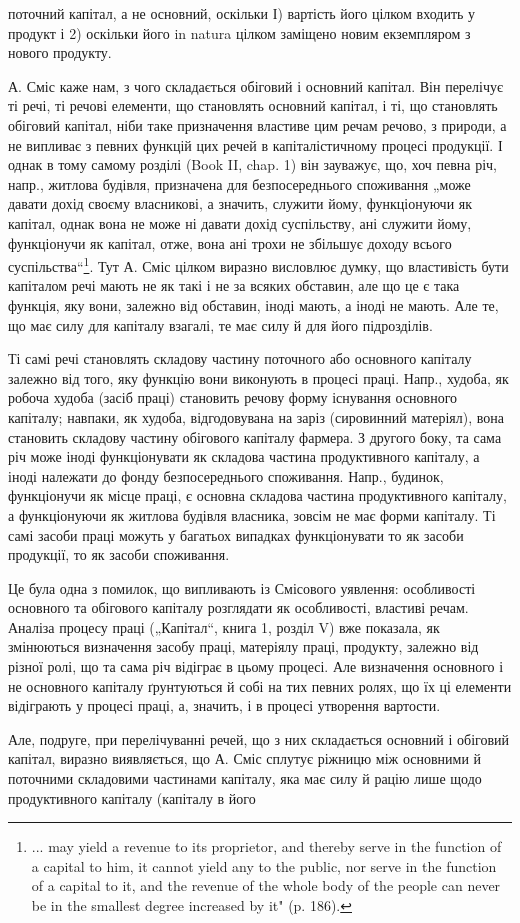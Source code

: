 \parcont{}  %
поточний капітал, а не основний, оскільки І) вартість його цілком входить
у продукт і 2) оскільки його in natura цілком заміщено новим екземпляром
з нового продукту.

А. Сміс каже нам, з чого складається обіговий і основний капітал.
Він перелічує ті речі, ті речові елементи, що становлять основний капітал,
і ті, що становлять обіговий капітал, ніби таке призначення властиве
цим речам речово, з природи, а не випливає з певних функцій
цих речей в капіталістичному процесі продукції. І однак в тому самому
розділі (Book II, chap. 1) він зауважує, що, хоч певна річ, напр., житлова
будівля, призначена для безпосереднього споживання „може давати
дохід своєму власникові, а значить, служити йому, функціонуючи як
капітал, однак вона не може ні давати дохід суспільству, ані служити
йому, функціонучи як капітал, отже, вона ані трохи не збільшує доходу
всього суспільства“\footnote*{
... may yield a revenue to its proprietor, and thereby serve in the function
of a capital to him, it cannot yield any to the public, nor serve in the function
of a capital to it, and the revenue of the whole body of the people can never be
in the smallest degree increased by it" (p. 186).
}. Тут А. Сміс цілком виразно висловлює думку, що
властивість бути капіталом речі мають не як такі і не за всяких обставин,
але що це є така функція, яку вони, залежно від обставин, іноді мають,
а іноді не мають. Але те, що має силу для капіталу взагалі, те має
силу й для його підрозділів.

Ті самі речі становлять складову частину поточного або основного
капіталу залежно від того, яку функцію вони виконують в процесі праці.
Напр., худоба, як робоча худоба (засіб праці) становить речову форму
існування основного капіталу; навпаки, як худоба, відгодовувана на
заріз (сировинний матеріял), вона становить складову частину обігового
капіталу фармера. З другого боку, та сама річ може іноді функціонувати
як складова частина продуктивного капіталу, а іноді належати до
фонду безпосереднього споживання. Напр., будинок, функціонучи як місце
праці, є основна складова частина продуктивного капіталу, а функціонуючи
як житлова будівля власника, зовсім не має форми капіталу.
Ті самі засоби праці можуть у багатьох випадках функціонувати то як
засоби продукції, то як засоби споживання.

Це була одна з помилок, що випливають із Смісового уявлення: особливості
основного та обігового капіталу розглядати як особливості,
властиві речам. Аналіза процесу праці („Капітал“, книга 1, розділ V)
вже показала, як змінюються визначення засобу праці, матеріялу праці,
продукту, залежно від різної ролі, що та сама річ відіграє в цьому
процесі. Але визначення основного і не основного капіталу ґрунтуються
й собі на тих певних ролях, що їх ці елементи відіграють у процесі праці,
а, значить, і в процесі утворення вартости.

Але, подруге, при перелічуванні речей, що з них складається основний
і обіговий капітал, виразно виявляється, що А. Сміс сплутує ріжницю
між основними й поточними складовими частинами капіталу, яка має
силу й рацію лише щодо продуктивного капіталу (капіталу в його
\parbreak{}  %
